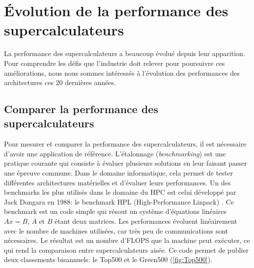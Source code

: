\section{Évolution de la performance des supercalculateurs}\label{sec:edl_evolution}

La performance des supercalculateurs a beaucoup évolué depuis leur apparition. Pour comprendre les défis que l'industrie doit relever pour poursuivre ces améliorations, nous nous sommes intéressés à l'évolution des performances des architectures ces 20 dernières années.


\subsection{Comparer la performance des supercalculateurs}

    Pour mesurer et comparer la performance des supercalculateurs, il est nécessaire d'avoir une application de référence. L'étalonnage (\textit{benchmarking}) est une pratique courante qui consiste à évaluer plusieurs solutions en leur faisant passer une épreuve commune. Dans le domaine informatique, cela permet de tester différentes architectures matérielles et d'évaluer leurs performances. Un des benchmarks les plus utilisés dans le domaine du HPC est celui développé par Jack Dongara en 1988: le benchmark HPL (High-Performance Linpack) \cite{Dongarra2003}. Ce benchmark est un code simple qui résout un système d'équations linéaires $Ax = B$, $A$ et $B$ étant deux matrices. Les performances évoluent linéairement avec le nombre de machines utilisées, car très peu de communications sont nécessaires. Le résultat est un nombre d'\gls{FLOPS} que la machine peut exécuter, ce qui rend la comparaison entre supercalculateurs aisée.
    Ce code permet de publier deux classements bisannuels: le Top500 et le Green500 (\autoref{fig:Top500}).

